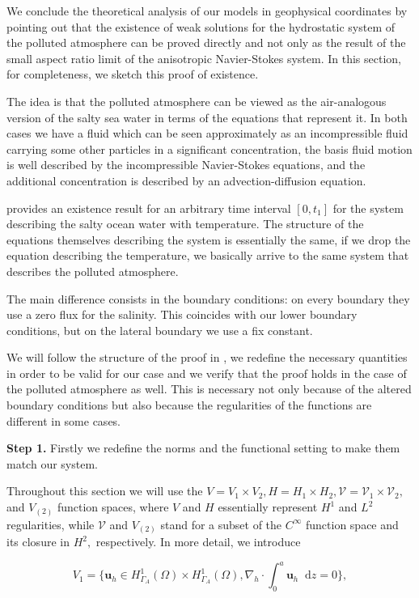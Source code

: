 \documentclass[12pt]{report}
\numberwithin{theorem}{chapter}
\numberwithin{corollary}{chapter}
\numberwithin{lemma}{chapter}
\numberwithin{remark}{chapter}
\numberwithin{definition}{chapter}
\numberwithin{prop}{chapter}
\newcommand*\diff{\mathop{}\!\mathrm{d}}
\begin{document}
We conclude the theoretical analysis of our models in geophysical coordinates by pointing out that the existence of weak solutions for the hydrostatic system of the polluted atmosphere can be proved directly and not only as the result of the small aspect ratio limit of the anisotropic Navier-Stokes system. In this section, for completeness, we sketch this proof of existence.

The idea is that the polluted atmosphere can be viewed as the air-analogous version of the salty sea water in terms of the equations that represent it. In both cases we have a fluid which can be seen approximately as an incompressible fluid carrying some other particles in a significant concentration, the basis fluid motion is well described by the incompressible Navier-Stokes equations, and the additional concentration is described by an advection-diffusion equation. 

\cite{temam2005some} provides an existence result for an arbitrary time interval $[0, t_1]$ for the system describing the salty ocean water with temperature. The structure of the equations themselves describing the system is essentially the same, if we drop the equation describing the temperature, we basically arrive to the same system that describes the polluted atmosphere.

The main difference consists in the boundary conditions: on every boundary they use a zero flux for the salinity. This coincides with our lower boundary conditions, but on the lateral boundary we use a fix constant.

We will follow the structure of the proof in \cite{temam2005some}, we redefine the necessary quantities in order to be valid for our case and we verify that the proof holds in the case of the polluted atmosphere as well. This is necessary not only because of the altered boundary conditions but also because the regularities of the functions are different in some cases.

\textbf{Step 1.} Firstly we redefine the norms and the functional setting to make them match our system.

Throughout this section we will use the $V = V_1 \times V_2, H = H_1 \times H_2, \mathcal{V} = \mathcal{V}_1 \times \mathcal{V}_2,$ and $V_{(2)}$ function spaces, where $V$ and $H$ essentially represent $H^1$ and $L^2$ regularities, while $\mathcal{V}$ and $V_{(2)}$ stand for a subset of the $C^{\infty}$ function space and its closure in $H^2,$ respectively. In more detail, we introduce

$$ V_1 = \{ \mathbf{u}_h \in H^1_{\Gamma_A} (\Omega) \times H^1_{\Gamma_A} (\Omega), \nabla_h \cdot \int_0^a \mathbf{u}_h \diff z = 0  \}, $$
\end{document}
